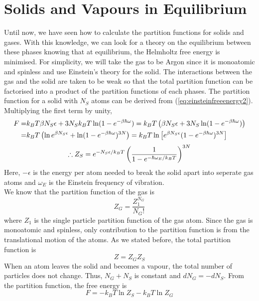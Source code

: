 \section{Solids and Vapours in Equilibrium}
    Until now, we have seen how to calculate the partition functions for solids and gases. With this knowledge, we can look for a theory on the equilibrium between these phases knowing that at equilibrium, the Helmholtz free energy is minimised. For simplicity, we will take the gas to be Argon since it is monoatomic and spinless and use Einstein's theory for the solid. The interactions between the gas and the solid are taken to be weak so that the total partition function can be factorised into a product of the partition functions of each phases. The partition function for a solid with $N_S$ atoms can be derived from (\ref{eq:einsteinfreeenergy2}). Multiplying the first term by unity,
    \begin{align}
        F =& k_BT\beta N_S\epsilon + 3N_Sk_BT\ln(1-e^{-\beta\hbar\omega}) = k_BT\left( \beta N_S\epsilon + 3N_S\ln(1-e^{-\beta\hbar\omega}) \right) \notag\\
          =& k_BT\left( \ln e^{\beta N_S\epsilon}+\ln(1-e^{-\beta\hbar\omega})^{3N} \right) = k_BT\ln\left[ e^{\beta N_S\epsilon}(1-e^{-\beta\hbar\omega})^{3N} \right]
    \end{align}
    \begin{equation}
        \therefore Z_S = e^{-N_S\epsilon/k_BT}\left( \frac{1}{1-e^{-\hbar\omega_E/k_BT}} \right)^{3N}
    \end{equation}
    Here, $-\epsilon$ is the energy per atom needed to break the solid apart into seperate gas atoms and $\omega_E$ is the Einstein frequency of vibration.\\
    We know that the partition function of the gas is
    \begin{equation}
        Z_G = \frac{Z_1^{N_G}}{N_G!}
    \end{equation}
    where $Z_1$ is the single particle partition function of the gas atom. Since the gas is monoatomic and spinless, only contribution to the partition function is from the translational motion of the atoms. As we stated before, the total partition function is
    \begin{equation}
        Z = Z_GZ_S
    \end{equation}
    When an atom leaves the solid and becomes a vapour, the total number of particles does not change. Thus, $N_G+N_S$ is constant and $dN_G=-dN_S$. From the partition function, the free energy is
    \begin{equation}
        F = -k_BT\ln Z_S -k_BT\ln Z_G
    \end{equation}
